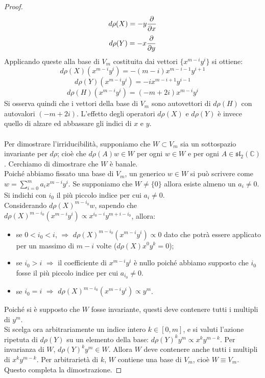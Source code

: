 \documentclass[12pt,a4paper]{report}
\theoremstyle{definition}
\theoremstyle{definition}
\theoremstyle{definition}
\theoremstyle{definition}
\begin{document}
\begin{proof}
	\begin{equation*}
	d\rho(X)=-y{\partial\over\partial x}
\end{equation*}
	\begin{equation*}
	d\rho(Y)=-x{\partial\over\partial y}
\end{equation*}
	Applicando queste alla base di $V_m$ costituita dai vettori $\{x^{m-i}y^i\}$ si ottiene:
	$$d\rho(X)(x^{m-i}y^i)=-(m-i)x^{m-i-1}y^{i+1}$$
	$$d\rho(Y)(x^{m-i}y^i)=-ix^{m-i+1}y^{i-1}$$
	$$d\rho(H)(x^{m-i}y^i)=(-m+2i)x^{m-i}y^i$$
	Si osserva quindi che i vettori della base di $V_m$ sono autovettori di $d\rho(H)$ con autovalori $(-m+2i)$. L'effetto degli operatori $d\rho(X)$ e $d\rho(Y)$ è invece quello di alzare ed abbassare gli indici di $x$ e $y$.\\
	\\
	Per dimostrare l'irriducibilità, supponiamo che $W\subset V_m$ sia un sottospazio invariante per $d\rho$; cioè che $d\rho(A)w\in W$ per ogni $w\in W$ e per ogni $A\in \mathfrak{sl_2(\mathbb{C})}$. Cerchiamo di dimostrare che $W$ è banale. \\Poiché abbiamo fissato una base di $V_m$, un generico $w\in W$ si può scrivere come $w=\sum_{i=0}^{m}a_ix^{m-i}y^i$. Se supponiamo che $W\neq\{0\}$ allora esiste almeno un $a_i\neq 0$.
	Si indichi con $i_0$ il più piccolo indice per cui $a_i\neq 0$. \\
	Considerando $d\rho(X)^{m-i_0}w$, sapendo che $d\rho(X)^{m-i_0}(x^{m-i}y^i)\propto x^{i_0-i}y^{m+i-i_0}$, allora:
	\begin{itemize}
		\item se $0<i_0<i$, $\Rightarrow$ $d\rho(X)^{m-i_0}(x^{m-i}y^i)\propto 0$ dato che potrà essere applicato per un massimo di $m-i$ volte ($d\rho(X)x^0y^k=0$);
		\item se $i_0>i$ $\Rightarrow$ il coefficiente di $x^{m-i}y^{i}$ è nullo poiché abbiamo supposto che $i_0$ fosse il più piccolo indice per cui $a_{i_0}\neq 0$. 
		\item se $i_0=i$ $\Rightarrow$ $d\rho(X)^{m-i_0}(x^{m-i}y^i)\propto y^m$.
	\end{itemize} 
	Poiché si è supposto che $W$ fosse invariante, questi deve contenere tutti i multipli di $y^m$.\\
	Si scelga ora arbitrariamente un indice intero $k\in[0,m]$, e si valuti l'azione ripetuta di $d\rho(Y)$ su un elemento della base: $d\rho(Y)^ky^m\propto x^ky^{m-k}$.
	Per invarianza di $W$, $d\rho(Y)^ky^m\in W$. Allora $W$ deve contenere anche tutti i multipli di $x^ky^{m-k}$. Per arbitrarietà di $k$, $W$ contiene una base di $V_m$, cioè $W\equiv V_m$.\\
	Questo completa la dimostrazione.
\end{proof}
\end{document}
